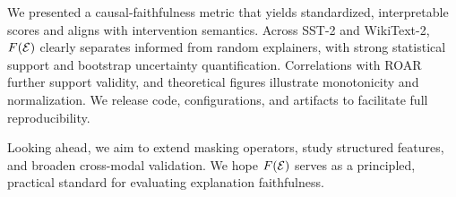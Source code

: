 We presented a causal-faithfulness metric that yields standardized, interpretable scores and aligns with intervention semantics. Across SST-2 and WikiText-2, $F(\mathcal{E})$ clearly separates informed from random explainers, with strong statistical support and bootstrap uncertainty quantification. Correlations with ROAR further support validity, and theoretical figures illustrate monotonicity and normalization. We release code, configurations, and artifacts to facilitate full reproducibility.

Looking ahead, we aim to extend masking operators, study structured features, and broaden cross-modal validation. We hope $F(\mathcal{E})$ serves as a principled, practical standard for evaluating explanation faithfulness.

